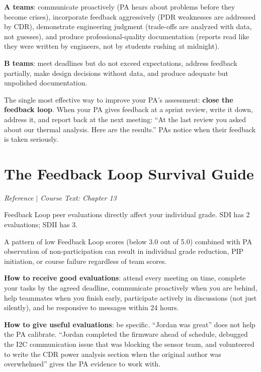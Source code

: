 \documentclass[11pt,letterpaper]{article}
\begin{document}
\begin{faqbox}
\textbf{A teams}: communicate proactively (PA hears about problems before they become crises), incorporate feedback aggressively (PDR weaknesses are addressed by CDR), demonstrate engineering judgment (trade-offs are analyzed with data, not guesses), and produce professional-quality documentation (reports read like they were written by engineers, not by students rushing at midnight).

\textbf{B teams}: meet deadlines but do not exceed expectations, address feedback partially, make design decisions without data, and produce adequate but unpolished documentation.
\end{faqbox}

\begin{protip}
The single most effective way to improve your PA's assessment: \textbf{close the feedback loop}. When your PA gives feedback at a sprint review, write it down, address it, and report back at the next meeting: ``At the last review you asked about our thermal analysis. Here are the results.'' PAs notice when their feedback is taken seriously.
\end{protip}


\section{The Feedback Loop Survival Guide}
\textit{Reference $|$ Course Text: Chapter 13}

Feedback Loop peer evaluations directly affect your individual grade. SDI has 2 evaluations; SDII has 3.

\begin{warnbox}
A pattern of low Feedback Loop scores (below 3.0 out of 5.0) combined with PA observation of non-participation can result in individual grade reduction, PIP initiation, or course failure regardless of team scores.
\end{warnbox}

\textbf{How to receive good evaluations}: attend every meeting on time, complete your tasks by the agreed deadline, communicate proactively when you are behind, help teammates when you finish early, participate actively in discussions (not just silently), and be responsive to messages within 24 hours.

\textbf{How to give useful evaluations}: be specific. ``Jordan was great'' does not help the PA calibrate. ``Jordan completed the firmware ahead of schedule, debugged the I2C communication issue that was blocking the sensor team, and volunteered to write the CDR power analysis section when the original author was overwhelmed'' gives the PA evidence to work with.
\end{document}
